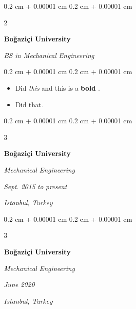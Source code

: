 \documentclass[10pt, letterpaper]{article}
\newenvironment{highlights}{
    \begin{itemize}[
        topsep=0.10 cm,
        parsep=0.10 cm,
        partopsep=0pt,
        itemsep=0pt,
        leftmargin=0.4 cm + 10pt + 0.6 cm
    ]
}{
    \end{itemize}
} %
\newenvironment{onecolentry}{
    \begin{adjustwidth}{
        0.2 cm + 0.00001 cm
    }{
        0.2 cm + 0.00001 cm
    }
}{
    \end{adjustwidth}
} %
\newenvironment{onecolentrybulleted}{
    \onecolentry
    \setcolumnwidth{0.6 cm, \fill}
    \begin{paracol}{2}
    \vspace*{\fill}
    \textbullet
    \vspace*{3px}
    \vspace*{\fill}
    \switchcolumn
}{
    \end{paracol}
    \endonecolentry
} %
\newenvironment{threecolentry}[3][]{
    \onecolentry
    \def\thirdColumn{#3}
    \setcolumnwidth{0.6 cm, \fill, 4.1 cm}
    \begin{paracol}{3}
    #2 \switchcolumn
}{
    \switchcolumn \raggedleft \thirdColumn
    \end{paracol}
    \endonecolentry
} %
\let\hrefWithoutArrow\href
\renewcommand{\href}[2]{\hrefWithoutArrow{#1}{\mbox{\ifthenelse{\equal{#2}{}}{ }{#2 }\raisebox{.15ex}{\footnotesize \faExternalLink*}}}}
\begin{document}
        \vspace{0.2 cm}

        \begin{onecolentrybulleted}
            \textbf{Boğaziçi University}

            \textit{BS in Mechanical Engineering}
        \end{onecolentrybulleted}

        \vspace{0.10 cm}
        \begin{onecolentry}
            \begin{highlights}
                \item Did \textit{this} and this is a \textbf{bold} \href{https://example.com}{link}.
                \item Did that.
            \end{highlights}
        \end{onecolentry}


        \vspace{0.2 cm}

        \begin{threecolentry}{
            \vspace*{\fill}
            \textbullet
            \vspace*{3px}
            \vspace*{\fill}
        }{
        \textit{Sept. 2015 to present}
            
        \textit{Istanbul, Turkey}}
            \textbf{Boğaziçi University}

            \textit{Mechanical Engineering}
        \end{threecolentry}



        \vspace{0.2 cm}

        \begin{threecolentry}{
            \vspace*{\fill}
            \textbullet
            \vspace*{3px}
            \vspace*{\fill}
        }{
        \textit{June 2020}
            
        \textit{Istanbul, Turkey}}
            \textbf{Boğaziçi University}

            \textit{Mechanical Engineering}
        \end{threecolentry}
\end{document}
